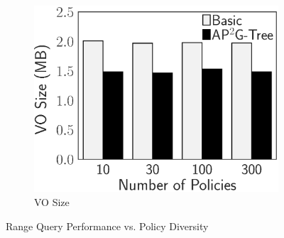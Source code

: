 \begin{figure}[t]
\begin{subfigure}{.33\linewidth}
        \includegraphics[height=\ht\figbox]{exp-figs/access-control/policy_1_vo.eps}
        \caption{VO Size}
    \end{subfigure}
    \caption{Range Query Performance vs. Policy Diversity}\label{exp-fig:access-control:policy_1}
\end{figure}
